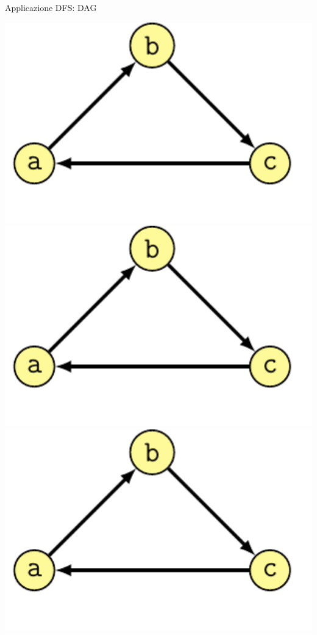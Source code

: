 \begin{frame}{Applicazione DFS: DAG}
\begin{center}
\begin{overprint}[0.5\textwidth]
\includegraphics[width=1.0\textwidth,page=4]{acyclic-schema-ciclo.pdf}
\includegraphics[width=1.0\textwidth,page=5]{acyclic-schema-ciclo.pdf}
\includegraphics[width=1.0\textwidth,page=6]{acyclic-schema-ciclo.pdf}

\end{overprint}
\end{center}
\end{frame}
